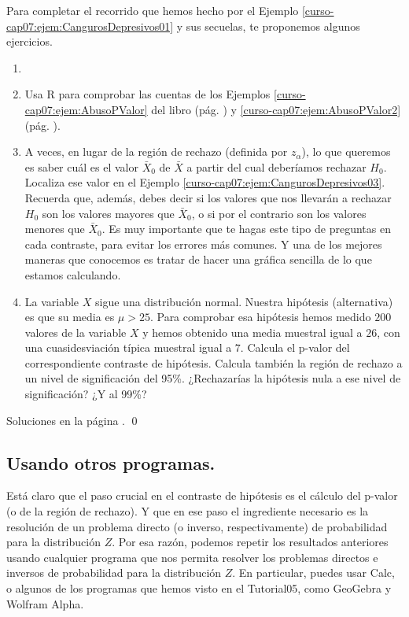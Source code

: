 \documentclass[10pt,a4paper]{article}\usepackage[]{graphicx}\usepackage[]{color}
\newcounter {cont01}
\begin{document}
Para completar el recorrido que hemos hecho por el Ejemplo \ref{curso-cap07:ejem:CangurosDepresivos01} y sus secuelas, te proponemos algunos ejercicios.

\begin{ejercicio}
\label{tut07:ejercicio01}
\begin{enumerate}
  \item[]
  \item Usa R para comprobar las cuentas de los Ejemplos \ref{curso-cap07:ejem:AbusoPValor} del libro (pág. \pageref{curso-cap07:ejem:AbusoPValor}) y \ref{curso-cap07:ejem:AbusoPValor2} (pág. \pageref{curso-cap07:ejem:AbusoPValor2}).

  \item A veces, en lugar de la región de rechazo (definida por $z_{\alpha}$), lo que queremos es saber cuál es el valor $\bar X_0$ de $\bar X$ a partir del cual deberíamos rechazar $H_0$. Localiza ese valor en el Ejemplo \ref{curso-cap07:ejem:CangurosDepresivos03}. Recuerda que, además, debes decir si los valores que nos llevarán a rechazar $H_0$ son los valores mayores que $\bar X_0$, o si por el contrario son los valores menores que $\bar X_0$. Es muy importante que te hagas este tipo de preguntas en cada contraste, para evitar los errores más comunes. Y una de los mejores maneras que conocemos es tratar de hacer una gráfica sencilla de lo que estamos calculando.

  \item La variable $X$ sigue una distribución normal. Nuestra hipótesis (alternativa) es que su media es $\mu > 25$. Para comprobar esa hipótesis hemos medido $200$ valores de la variable $X$ y hemos obtenido una media muestral igual a $26$, con una cuasidesviación típica muestral igual a $7$. Calcula el p-valor del correspondiente contraste de hipótesis. Calcula también la región de rechazo a un nivel de significación del 95\%. ¿Rechazarías la hipótesis nula a ese nivel de significación? ¿Y al 99\%?

\end{enumerate}
Soluciones en la página \pageref{tut07:ejercicio01:sol}.
\qed
\end{ejercicio}


\subsection{Usando otros programas.}

Está claro que el paso crucial en el contraste de hipótesis es el cálculo del p-valor (o de la región de rechazo). Y que en ese paso el ingrediente necesario es la resolución de un problema directo (o inverso, respectivamente) de probabilidad para la distribución $Z$. Por esa razón, podemos repetir los resultados anteriores usando cualquier programa que nos permita resolver los problemas directos e inversos de probabilidad para la distribución $Z$. En particular, puedes usar Calc, o algunos de los programas que hemos visto en el Tutorial05, como GeoGebra y Wolfram Alpha.
\end{document}
